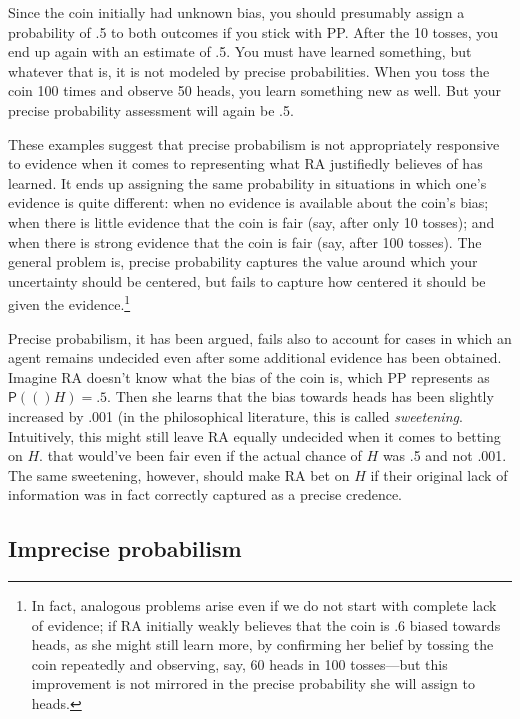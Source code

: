 \documentclass[
  10pt,
  dvipsnames,enabledeprecatedfontcommands]{scrartcl}
\newcommand{\pr}[1]{\mathsf{P}(#1)}
\begin{document}
\noindent Since the coin initially had unknown bias, you should
presumably assign a probability of .5 to both outcomes if you stick with
\textsf{PP}. After the 10 tosses, you end up again with an estimate of
.5. You must have learned something, but whatever that is, it is not
modeled by precise probabilities. When you toss the coin 100 times and
observe 50 heads, you learn something new as well. But your precise
probability assessment will again be .5.

These examples suggest that precise probabilism is not appropriately
responsive to evidence when it comes to representing what RA justifiedly
believes of has learned. It ends up assigning the same probability in
situations in which one's evidence is quite different: when no evidence
is available about the coin's bias; when there is little evidence that
the coin is fair (say, after only 10 tosses); and when there is strong
evidence that the coin is fair (say, after 100 tosses). The general
problem is, precise probability captures the value around which your
uncertainty should be centered, but fails to capture how centered it
should be given the evidence.\footnote{In fact, analogous problems arise
  even if we do not start with complete lack of evidence; if RA
  initially weakly believes that the coin is .6 biased towards heads, as
  she might still learn more, by confirming her belief by tossing the
  coin repeatedly and observing, say, 60 heads in 100 tosses---but this
  improvement is not mirrored in the precise probability she will assign
  to heads.}

Precise probabilism, it has been argued, fails also to account for cases
in which an agent remains undecided even after some additional evidence
has been obtained. Imagine RA doesn't know what the bias of the coin is,
which PP represents as \(\pr(H)= .5\). Then she learns that the bias
towards heads has been slightly increased by .001 (in the philosophical
literature, this is called \emph{sweetening}. Intuitively, this might
still leave RA equally undecided when it comes to betting on \(H\). that
would've been fair even if the actual chance of \(H\) was .5 and not
.001. The same sweetening, however, should make RA bet on \(H\) if their
original lack of information was in fact correctly captured as a precise
credence.

\hypertarget{imprecise-probabilism}{%
\subsection{Imprecise probabilism}\label{imprecise-probabilism}}
\end{document}
